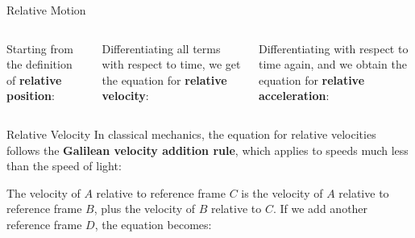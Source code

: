 \documentclass[12pt,compress,aspectratio=169,dvipsnames]{beamer}
\begin{document}
\begin{frame}{Relative Motion}
  \begin{columns}

    Starting from the definition of \textbf{relative position}:

    
    \vspace{-.13in}Differentiating all terms with respect to time, we get the
    equation for \textbf{relative velocity}:


    \vspace{-.13in}Differentiating with respect to time again, and we obtain
    the equation for \textbf{relative acceleration}:

  \end{columns}
\end{frame}



\begin{frame}{Relative Velocity}
  In classical mechanics, the equation for relative velocities follows the
  \textbf{Galilean velocity addition rule}, which applies to speeds much less
  than the speed of light:


  The velocity of $A$ relative to reference frame $C$ is the velocity of $A$
  relative to reference frame $B$, plus the velocity of $B$ relative to $C$. If
  we add another reference frame $D$, the equation becomes:

\end{frame}
\end{document}
